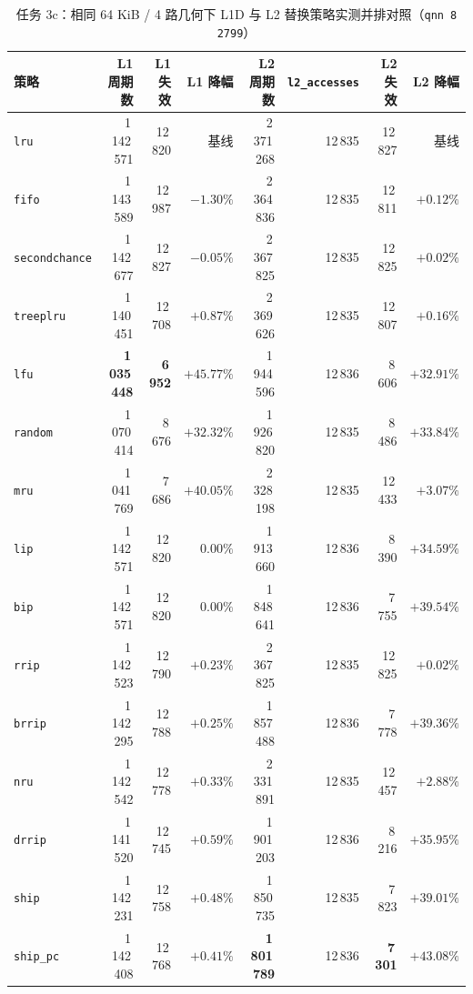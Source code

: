 \documentclass[12pt,a4paper,fontset=mac]{ctexart}
\begin{document}
\begin{table}[H]\centering\scriptsize\setlength{\tabcolsep}{3.4pt}
\caption{任务 3c：相同 64 KiB / 4 路几何下 L1D 与 L2 替换策略实测并排对照（\texttt{qnn 8 2799}）}\label{tab:t3c_l1_l2}
\begin{tabular}{lrrrrrrr}\toprule
策略 & L1 周期数 & L1 失效 & L1 降幅 & L2 周期数 & \texttt{l2\_accesses} & L2 失效 & L2 降幅 \\\midrule
\texttt{lru}          & 1\,142\,571 & 12\,820 & 基线       & 2\,371\,268 & 12\,835 & 12\,827 & 基线 \\
\texttt{fifo}         & 1\,143\,589 & 12\,987 & $-1.30\%$  & 2\,364\,836 & 12\,835 & 12\,811 & $+0.12\%$ \\
\texttt{secondchance} & 1\,142\,677 & 12\,827 & $-0.05\%$  & 2\,367\,825 & 12\,835 & 12\,825 & $+0.02\%$ \\
\texttt{treeplru}     & 1\,140\,451 & 12\,708 & $+0.87\%$  & 2\,369\,626 & 12\,835 & 12\,807 & $+0.16\%$ \\
\texttt{lfu}          & \textbf{1\,035\,448} & \textbf{6\,952} & \textbf{$+45.77\%$} & 1\,944\,596 & 12\,836 & 8\,606 & $+32.91\%$ \\
\texttt{random}       & 1\,070\,414 & 8\,676  & $+32.32\%$ & 1\,926\,820 & 12\,835 & 8\,486 & $+33.84\%$ \\
\texttt{mru}          & 1\,041\,769 & 7\,686  & $+40.05\%$ & 2\,328\,198 & 12\,835 & 12\,433 & $+3.07\%$ \\
\midrule
\texttt{lip}          & 1\,142\,571 & 12\,820 & $0.00\%$   & 1\,913\,660 & 12\,836 & 8\,390 & $+34.59\%$ \\
\texttt{bip}          & 1\,142\,571 & 12\,820 & $0.00\%$   & 1\,848\,641 & 12\,836 & 7\,755 & $+39.54\%$ \\
\texttt{rrip}         & 1\,142\,523 & 12\,790 & $+0.23\%$  & 2\,367\,825 & 12\,835 & 12\,825 & $+0.02\%$ \\
\texttt{brrip}        & 1\,142\,295 & 12\,788 & $+0.25\%$  & 1\,857\,488 & 12\,836 & 7\,778 & $+39.36\%$ \\
\texttt{nru}          & 1\,142\,542 & 12\,778 & $+0.33\%$  & 2\,331\,891 & 12\,835 & 12\,457 & $+2.88\%$ \\
\texttt{drrip}        & 1\,141\,520 & 12\,745 & $+0.59\%$  & 1\,901\,203 & 12\,836 & 8\,216 & $+35.95\%$ \\
\texttt{ship}         & 1\,142\,231 & 12\,758 & $+0.48\%$  & 1\,850\,735 & 12\,835 & 7\,823 & $+39.01\%$ \\
\texttt{ship\_pc}     & 1\,142\,408 & 12\,768 & $+0.41\%$  & \textbf{1\,801\,789} & 12\,836 & \textbf{7\,301} & \textbf{$+43.08\%$} \\
\bottomrule\end{tabular}
\end{table}
\end{document}

